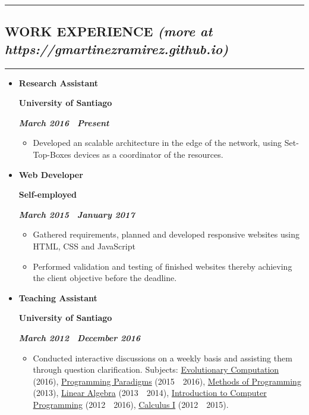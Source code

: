 \documentclass[10pt,letterpaper]{article}
\newcommand{\textbox}[1]{
  \parbox{.333\textwidth}{#1}
}
\newcommand{\sectionTitle}[1]{
  \hrule
  \vspace{-1.0em} 
  \subsection*{\uppercase{\textbf{#1}} }
  \vspace{-0.3em}
    \hrule
    \vspace{0.3em}  
}
\newcommand{\sectionTitleWithWeb}[2]{
  \hrule
  \vspace{-1.0em} 
  \subsection*{\uppercase{\textbf{#1}} \hfill{\small \textit{(more at #2)}}}
  \vspace{-0.3em}
  \hrule
  \vspace{0.3em}  
}
\newcommand{\titleExperienceWithoutLocation}[4]{
  \vspace{1.0em}
  \item[]
  {
    \textbox{\textbf{#1}\hfill}\textbox{\hfil \textbf{#2}\hfil}\hfill \textbf{\emph{#3 \textendash \ #4}}
  }
}
\begin{document}
  \vspace{0.30em} 
  
  \sectionTitleWithWeb{Work Experience}{https://gmartinezramirez.github.io}
  \vspace{-1.1em}
  \begin{itemize}[noitemsep,topsep=0pt]
    \titleExperienceWithoutLocation{Research Assistant}{University of Santiago}{March 2016}{Present}
      \begin{itemize}[label=\textbullet,noitemsep,topsep=0pt]
        \item Developed an scalable architecture in the edge of the network, using Set-Top-Boxes devices as a coordinator of the resources.
      \end{itemize}

    \vspace{-0.6em} 
    \titleExperienceWithoutLocation{Web Developer}{Self-employed}{March 2015}{January 2017}
      \begin{itemize}[label=\textbullet,noitemsep,topsep=0pt]
        \item Gathered requirements, planned and developed responsive websites using HTML, CSS and JavaScript 
        \item Performed validation and testing of finished websites thereby achieving the client objective before the deadline.
      \end{itemize}
    
    \vspace{-0.6em} 
    \titleExperienceWithoutLocation{Teaching Assistant}{University of Santiago}{March 2012}{December 2016}
      \begin{itemize}[label=\textbullet]
        \itemsep0em
        \item Conducted interactive discussions on a weekly basis and assisting them through question clarification. Subjects: \ul{Evolutionary Computation} (2016), \ul{Programming Paradigms} (2015\ \textendash \ 2016), \ul{Methods of Programming} (2013), \ul{Linear Algebra} (2013\ \textendash \ 2014), \ul{Introduction to Computer Programming} (2012\ \textendash \ 2016), \ul{Calculus I} (2012\ \textendash \ 2015).
      \end{itemize}
  \end{itemize}
  \vspace{0.30em} 
\end{document}
